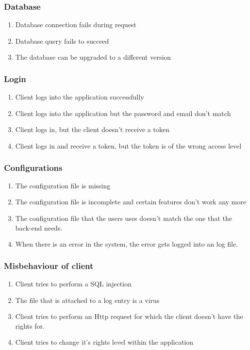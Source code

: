 \subsubsection{Database}
\begin{enumerate}
\item Database connection fails during request
\item Database query fails to succeed 
\item The database can be upgraded to a different version 
\end{enumerate}

\subsubsection{Login}
\begin{enumerate}
\item Client logs into the application successfully
\item Client logs into the application but the password and email don't match
\item Client logs in, but the client doesn't receive a token
\item Client logs in and receive a token, but the token is of the wrong access level
\end{enumerate}

\subsubsection{Configurations}
\begin{enumerate}
\item The configuration file is missing
\item The configuration file is incomplete and certain features don't work any more
\item The configuration file that the users uses doesn't match the one that the back-end needs.
\item When there is an error in the system, the error gets logged into an log file.
\end{enumerate}

\subsubsection{Misbehaviour of client}
\begin{enumerate}
\item Client tries to perform a SQL injection
\item The file that is attached to a log entry is a virus
\item Client tries to perform an Http request for which the client doesn't have the rights for.
\item Client tries to change it's rights level within the application

\end{enumerate}

